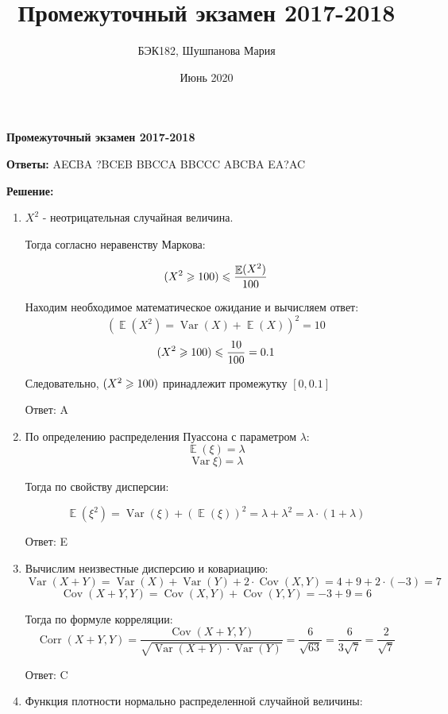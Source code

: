 \documentclass[a4paper]{article} %
\title{Промежуточный экзамен 2017-2018}
\author{БЭК182, Шушпанова Мария}
\date{Июнь 2020}
\DeclareMathOperator{\Var}{Var}
\DeclareMathOperator{\Cov}{Cov}
\DeclareMathOperator{\Corr}{Corr}
\DeclareMathOperator{\E}{\mathbb{E}}
\let\P\relax
\DeclareMathOperator{\P}{\mathbb{P}}
\renewcommand{\leq}{\leqslant}
\renewcommand{\geq}{\geqslant}
\begin{document}
\maketitle

\textbf{Промежуточный экзамен 2017-2018}

\textbf{Ответы:}
AEСBA ?BCEB BBCCA BBCCC ABCBA EA?AC

\vspace{\baselineskip}
\textbf{Решение:}

\begin{enumerate}

    \item

    $X^2$ - неотрицательная случайная величина. 
    
    Тогда согласно неравенству Маркова:

    \[\P(X^2 \geq 100) \leq \frac{\E(X^2)}{100} \]
    
    Находим необходимое математическое ожидание и вычисляем ответ:
     \[ (\E(X^2) = \Var(X) + \E(X))^2 = 10\]
     \[\P(X^2 \geq 100) \leq \frac{10}{100} = 0.1 \]
    
    Следовательно, $\P(X^2 \geq 100)$ принадлежит промежутку $[0, 0.1]$

    Ответ: A

    \item

    По определению распределения Пуассона с параметром $\lambda$:
    \[ \E(\xi) =\lambda \]
    \[ \Var\xi) =\lambda \]
    
    Тогда по свойству дисперсии:

    \[ \E(\xi^2) = \Var(\xi) + (\E(\xi))^2 = \lambda + \lambda^2 = \lambda \cdot (1 + \lambda)\]

    Ответ: E

    \item
    
    Вычислим неизвестные дисперсию и ковариацию:
    \[ \Var(X+Y) = \Var(X) + \Var(Y) + 2 \cdot \Cov(X,Y) = 4 + 9 + 2 \cdot (-3) = 7 \]
    \[\Cov(X+Y,Y) = \Cov(X,Y) + \Cov(Y,Y) = -3 + 9 = 6\]
    
    
    Тогда по формуле корреляции:
    \[ \Corr(X+Y,Y) = \frac{\Cov(X+Y,Y)}{\sqrt{\Var(X+Y)\cdot \Var(Y)}} = \frac{6}{\sqrt{63}} = \frac{6}{3\sqrt{7}} = \frac{2}{\sqrt{7}} \]

    Ответ: C

    \item
    
    Функция плотности нормально распределенной случайной величины:
    

\end{enumerate}
\end{document}
